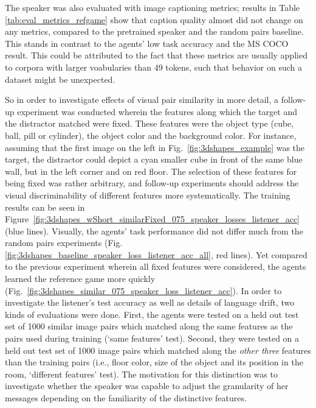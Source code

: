 The speaker was also evaluated with image captioning metrics; results in Table \ref{tab:eval_metrics_refgame} show that caption quality almost did not change on any metrics, compared to the pretrained speaker and the random pairs baseline. This stands in contrast to the agents' low task accuracy and the MS COCO result. This could be attributed to the fact that these metrics are usually applied to corpora with larger voabularies than 49 tokens, such that behavior on such a dataset might be unexpected.

So in order to investigate effects of visual pair similarity in more detail, a follow-up experiment was conducted wherein the features along which the target and the distractor matched were fixed. These features were the object type (cube, ball, pill or cylinder), the object color and the background color. For instance, assuming that the first image on the left in Fig.~\ref{fig:3dshapes_example} was the target, the distractor could depict a cyan smaller cube in front of the same blue wall, but in the left corner and on red floor.
The selection of these features for being fixed was rather arbitrary, and follow-up experiments should address the visual discriminability of different features more systematically. The training results can be seen in Figure~\ref{fig:3dshapes_wShort_similarFixed_075_speaker_losses_listener_acc} (blue lines). Visually, the agents' task performance did not differ much from the random pairs experiments (Fig. \ref{fig:3dshapes_baseline_speaker_loss_listener_acc_all}, red lines). Yet compared to the previous experiment wherein all fixed features were considered, the agents learned the reference game more quickly (Fig.~\ref{fig:3dshapes_similar_075_speaker_loss_listener_acc}). In order to investigate the listener's test accuracy as well as details of language drift, two kinds of evaluations were done. First, the agents were tested on a held out test set of 1000 similar image pairs which matched along the same features as the pairs used during training (`same features' test). Second, they were tested on a held out test set of 1000 image pairs which matched along the \emph{other three} features than the training pairs (i.e., floor color, size of the object and its position in the room, `different features' test). The motivation for this distinction was to investigate whether the speaker was capable to adjust the granularity of her messages depending on the familiarity of the distinctive features.


